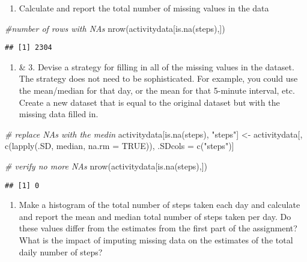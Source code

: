 \documentclass[
]{article}
\newenvironment{Shaded}{\begin{snugshade}}{\end{snugshade}}
\newcommand{\AttributeTok}[1]{\textcolor[rgb]{0.77,0.63,0.00}{#1}}
\newcommand{\CommentTok}[1]{\textcolor[rgb]{0.56,0.35,0.01}{\textit{#1}}}
\newcommand{\ConstantTok}[1]{\textcolor[rgb]{0.00,0.00,0.00}{#1}}
\newcommand{\FunctionTok}[1]{\textcolor[rgb]{0.00,0.00,0.00}{#1}}
\newcommand{\NormalTok}[1]{#1}
\newcommand{\OtherTok}[1]{\textcolor[rgb]{0.56,0.35,0.01}{#1}}
\newcommand{\StringTok}[1]{\textcolor[rgb]{0.31,0.60,0.02}{#1}}
\providecommand{\tightlist}{%
  \setlength{\itemsep}{0pt}\setlength{\parskip}{0pt}}
\begin{document}
\begin{enumerate}
\def\labelenumi{\arabic{enumi}.}
\tightlist
\item
  Calculate and report the total number of missing values in the data
\end{enumerate}

\begin{Shaded}
\begin{Highlighting}[]
\CommentTok{\#number of rows with NAs}
\FunctionTok{nrow}\NormalTok{(activitydata[}\FunctionTok{is.na}\NormalTok{(steps),])}
\end{Highlighting}
\end{Shaded}

\begin{verbatim}
## [1] 2304
\end{verbatim}

\begin{enumerate}
\def\labelenumi{\arabic{enumi}.}
\setcounter{enumi}{1}
\tightlist
\item
  \& 3. Devise a strategy for filling in all of the missing values in
  the dataset. The strategy does not need to be sophisticated. For
  example, you could use the mean/median for that day, or the mean for
  that 5-minute interval, etc. Create a new dataset that is equal to the
  original dataset but with the missing data filled in.
\end{enumerate}

\begin{Shaded}
\begin{Highlighting}[]
\CommentTok{\# replace NAs with the medin}
\NormalTok{activitydata[}\FunctionTok{is.na}\NormalTok{(steps), }\StringTok{"steps"}\NormalTok{] }\OtherTok{\textless{}{-}}\NormalTok{ activitydata[, }\FunctionTok{c}\NormalTok{(}\FunctionTok{lapply}\NormalTok{(.SD, median, }\AttributeTok{na.rm =} \ConstantTok{TRUE}\NormalTok{)), .SDcols }\OtherTok{=} \FunctionTok{c}\NormalTok{(}\StringTok{"steps"}\NormalTok{)]}

\CommentTok{\# verify no more NAs}
\FunctionTok{nrow}\NormalTok{(activitydata[}\FunctionTok{is.na}\NormalTok{(steps),])}
\end{Highlighting}
\end{Shaded}

\begin{verbatim}
## [1] 0
\end{verbatim}

\begin{enumerate}
\def\labelenumi{\arabic{enumi}.}
\setcounter{enumi}{3}
\tightlist
\item
  Make a histogram of the total number of steps taken each day and
  calculate and report the mean and median total number of steps taken
  per day. Do these values differ from the estimates from the first part
  of the assignment? What is the impact of imputing missing data on the
  estimates of the total daily number of steps?
\end{enumerate}
\end{document}
